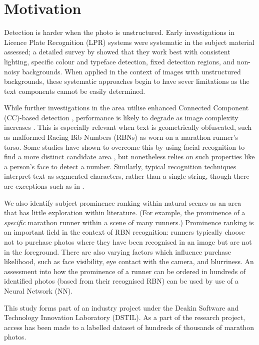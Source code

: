 \section{Motivation}
\label{sec:introduction:motivation}

Detection is harder when the photo is unstructured. Early investigations in Licence Plate Recognition (LPR) systems were systematic in the subject material assessed; a detailed survey by \cite{Anagnostopoulos:2008vu} showed that they work best  with consistent lighting, specific colour and typeface detection, fixed detection regions, and non-noisy backgrounds. When applied in the context of images with unstructured backgrounds, these systematic approaches begin to have sever limitations as the text components cannot be easily determined.

While further investigations in the area utilise enhanced Connected Component (CC)-based detection \citep{Chen:2011ul,Shivakumara:2011dn,Epshtein:2010tj}, performance is likely to degrade as image complexity increases \citep{Li:2012wd}. This is especially relevant when text is geometrically obfuscated, such as malformed Racing Bib Numbers (RBNs) as worn on a marathon runner's torso. Some studies have shown to overcome this by using facial recognition to find a more distinct candidate area \citep{Benami:2012jf}, but nonetheless relies on such properties like a person's face to detect a number. Similarly, typical recognition techniques interpret text as segmented characters, rather than a single string, though there are exceptions such as in \cite{Zhu:2016ut}.

We also identify subject prominence ranking within natural scenes as an area that has little exploration within literature. (For example, the prominence of a \textit{specific} marathon runner within a scene of many runners.) Prominence ranking is an important field in the context of RBN recognition: runners typically choose not to purchase photos where they have been recognised in an image but are not in the foreground. There are also varying factors which influence purchase likelihood, such as face visibility, eye contact with the camera, and blurriness. An assessment into how the prominence of a runner can be ordered in hundreds of identified photos (based from their recognised RBN) can be used by use of a Neural Network (NN).

This study forms part of an industry project under the Deakin Software and Technology Innovation Laboratory (DSTIL). As a part of the research project, access has been made to a labelled dataset of hundreds of thousands of marathon photos.

